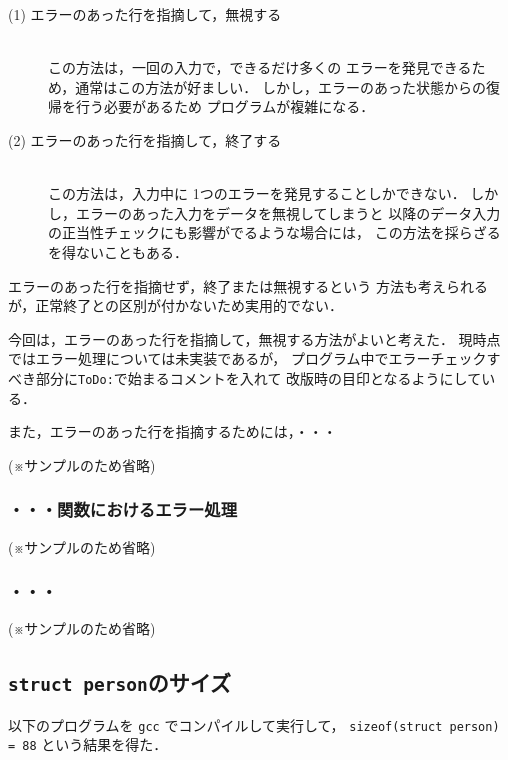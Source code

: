 \documentclass[a4j,11pt]{jarticle}
\begin{document}
\begin{description} %
  \item[(1) エラーのあった行を指摘して，無視する]~\\
    この方法は，一回の入力で，できるだけ多くの
    エラーを発見できるため，通常はこの方法が好ましい．
    しかし，エラーのあった状態からの復帰を行う必要があるため
    プログラムが複雑になる．
  \item[(2) エラーのあった行を指摘して，終了する]~\\
    この方法は，入力中に 1つのエラーを発見することしかできない．
    しかし，エラーのあった入力をデータを無視してしまうと
    以降のデータ入力の正当性チェックにも影響がでるような場合には，
    この方法を採らざるを得ないこともある．
\end{description}

エラーのあった行を指摘せず，終了または無視するという
方法も考えられるが，正常終了との区別が付かないため実用的でない．

今回は，エラーのあった行を指摘して，無視する方法がよいと考えた．
現時点ではエラー処理については未実装であるが，
プログラム中でエラーチェックすべき部分に\verb|ToDo:|で始まるコメントを入れて
改版時の目印となるようにしている．

また，エラーのあった行を指摘するためには，・・・

(※サンプルのため省略)

\subsubsection{・・・関数におけるエラー処理}

(※サンプルのため省略)

\subsubsection{・・・}

(※サンプルのため省略)


\subsection{\texttt{struct person}のサイズ}

以下のプログラムを \verb|gcc| でコンパイルして実行して，
\verb|sizeof(struct person) = 88| という結果を得た．
\end{document}
